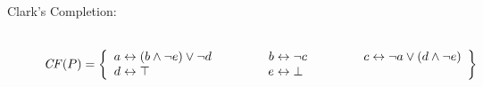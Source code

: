 \begin{Loesung}
\begin{UList}
\begin{description}
%
\item[Clark's Completion:] ~\\
\(
  \Comp{\Pi}
  = 
  \left\{
  \begin{array}{r@{}c@{}l@{\hspace{16mm}}r@{}c@{}l@{\hspace{16mm}}r@{}c@{}l}
    a & {} \leftrightarrow {} & (b\wedge \neg e) \vee \neg d &
    b & {} \leftrightarrow {} & \neg c   &   
    c & {} \leftrightarrow {} & \neg a \vee (d\wedge\neg e) 
    \\
    d & {} \leftrightarrow {} & \top &
    e & {} \leftrightarrow {} & \bot
  \end{array}
  \right\}
\)


\end{description}
\end{UList}
\end{Loesung}
